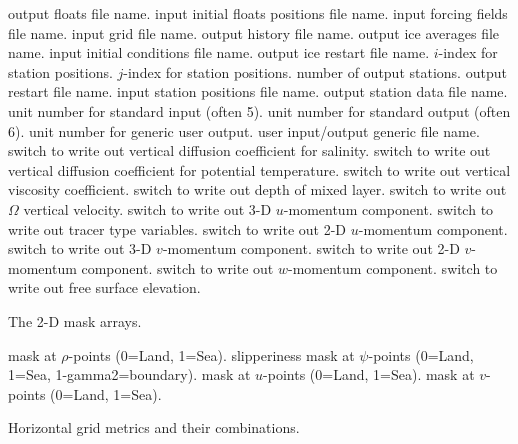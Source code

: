\begin{klist}
\begin{klist}
           output floats file name.
           input initial floats positions file name.
           input forcing fields file name.
           input grid file name.
           output history file name.
          output ice averages file name.
           input initial conditions file name.
          output ice restart file name.
             $i$-index for station positions.
             $j$-index for station positions.
          number of output stations.
           output restart file name.
           input station positions file name.
           output station data file name.
            unit number for standard input (often 5).
            unit number for standard output (often 6).
            unit number for generic user output.
           user input/output generic file name.
            switch to write out vertical diffusion
    coefficient for salinity.
            switch to write out vertical diffusion
    coefficient for potential temperature.
            switch to write out vertical viscosity
    coefficient.
            switch to write out depth of mixed layer.
              switch to write out $\Omega$ vertical
    velocity.
              switch to write out 3-D $u$-momentum
    component.
              switch to write out tracer type variables.
           switch to write out 2-D $u$-momentum
    component.
              switch to write out 3-D $v$-momentum
    component.
           switch to write out 2-D $v$-momentum
    component.
              switch to write out $w$-momentum component.
              switch to write out free surface elevation.
    \end{klist}
   The 2-D mask arrays.
    \begin{klist}
             mask at $\rho$-points (0=Land, 1=Sea).
             slipperiness mask at $\psi$-points
   (0=Land, 1=Sea, 1-gamma2=boundary).
             mask at $u$-points (0=Land, 1=Sea).
             mask at $v$-points (0=Land, 1=Sea).
    \end{klist}
    Horizontal grid metrics and their combinations.
    \begin{klist}

\end{klist}
\end{klist}
